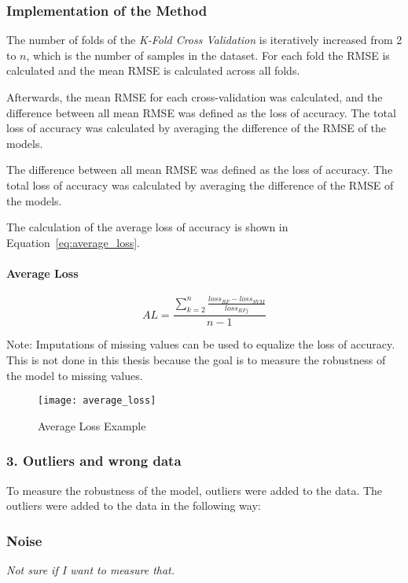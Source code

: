 \subsubsection*{Implementation of the Method}
The number of folds of the \textit{K-Fold Cross Validation} is iteratively increased from 2 to $n$, which is the number of samples in the dataset.
For each fold the \ac{RMSE} is calculated and the mean \ac{RMSE} is calculated across all folds.

Afterwards, the mean \ac{RMSE} for each cross-validation was calculated, and the difference between all mean \ac{RMSE} was defined as the loss of accuracy. The total loss of accuracy was calculated by averaging the difference of the \ac{RMSE} of the models.

The difference between all mean \ac{RMSE} was defined as the loss of accuracy. The total loss of accuracy was calculated by averaging the difference of the \ac{RMSE} of the models.

The calculation of the average loss of accuracy is shown in Equation~\ref{eq:average_loss}.

\paragraph*{Average Loss}

\begin{equation}
    \label{eq:average_loss}
    AL = \frac{\sum_{k=2}^{n} \frac{loss_{RF} - loss_{SVM}}{loss_{RFj}}}{n-1}
\end{equation}

Note: Imputations of missing values can be used to equalize the loss of accuracy. This is not done in this thesis because the goal is to measure the robustness of the model to missing values.

\begin{figure}[H]
    \centering
    \texttt{[image: average\_loss]}
    \caption{Average Loss Example}
    \label{fig:average_loss}
\end{figure}

\subsubsection*{3. Outliers and wrong data}
To measure the robustness of the model, outliers were added to the data. The outliers were added to the data in the following way:


\subsubsection*{Noise}
\textit{Not sure if I want to measure that.}


